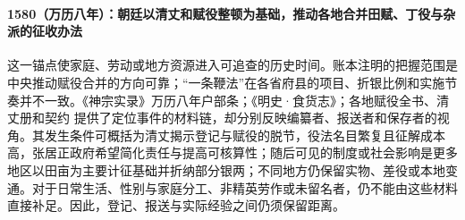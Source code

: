 \paragraph{1580（万历八年）：朝廷以清丈和赋役整顿为基础，推动各地合并田赋、丁役与杂派的征收办法} 这一锚点使家庭、劳动或地方资源进入可追查的历史时间。账本注明的把握范围是中央推动赋役合并的方向可靠；“一条鞭法”在各省府县的项目、折银比例和实施节奏并不一致。《神宗实录》万历八年户部条；《明史·食货志》；各地赋役全书、清丈册和契约 提供了定位事件的材料链，却分别反映编纂者、报送者和保存者的视角。其发生条件可概括为清丈揭示登记与赋役的脱节，役法名目繁复且征解成本高，张居正政府希望简化责任与提高可核算性；随后可见的制度或社会影响是更多地区以田亩为主要计征基础并折纳部分银两；不同地方仍保留实物、差役或本地变通。对于日常生活、性别与家庭分工、非精英劳作或未留名者，仍不能由这些材料直接补足。因此，登记、报送与实际经验之间仍须保留距离。
